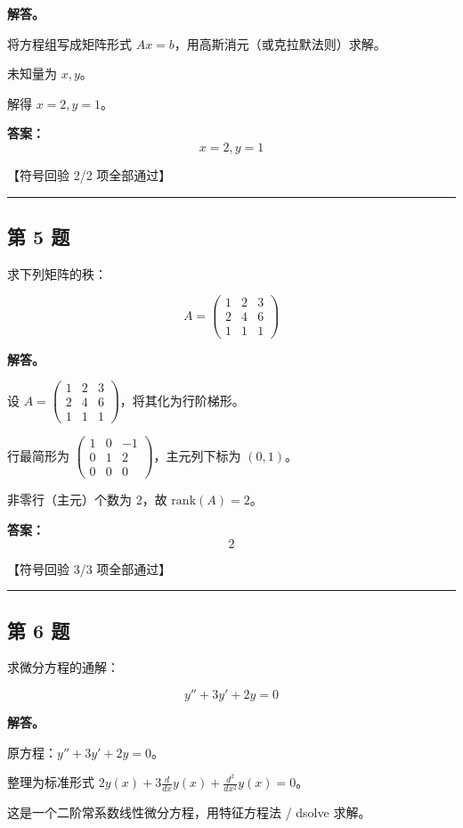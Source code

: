 \documentclass[12pt, a4paper]{article}
\newcommand{\problem}[1]{\subsection*{第 #1 题}}
\newcommand{\solution}{\textbf{解答。}}
\begin{document}
\solution

将方程组写成矩阵形式 $Ax = b$，用高斯消元（或克拉默法则）求解。

未知量为 $x, y$。

解得 $x = 2, y = 1$。

\textbf{答案：}
\[\boxed{x = 2, y = 1}\]

\textcolor{okgreen}{【符号回验 2/2 项全部通过】}

\vspace{0.8em}
\hrule
\vspace{0.8em}

\problem{5}

求下列矩阵的秩：

$$
A = \begin{pmatrix} 1 & 2 & 3 \\ 2 & 4 & 6 \\ 1 & 1 & 1 \end{pmatrix}
$$

\solution

设 $A = \begin{pmatrix} 1 & 2 & 3 \\ 2 & 4 & 6 \\ 1 & 1 & 1 \end{pmatrix}$，将其化为行阶梯形。

行最简形为 $\begin{pmatrix} 1 & 0 & -1 \\ 0 & 1 & 2 \\ 0 & 0 & 0 \end{pmatrix}$，主元列下标为 $(0, 1)$。

非零行（主元）个数为 $2$，故 $\mathrm{rank}(A) = 2$。

\textbf{答案：}
\[\boxed{2}\]

\textcolor{okgreen}{【符号回验 3/3 项全部通过】}

\vspace{0.8em}
\hrule
\vspace{0.8em}

\problem{6}

求微分方程的通解：

$$
y'' + 3y' + 2y = 0
$$

\solution

原方程：$y'' + 3y' + 2y = 0$。

整理为标准形式 $2 y{\left(x \right)} + 3 \frac{d}{d x} y{\left(x \right)} + \frac{d^{2}}{d x^{2}} y{\left(x \right)} = 0$。

这是一个二阶常系数线性微分方程，用特征方程法 / dsolve 求解。
\end{document}
